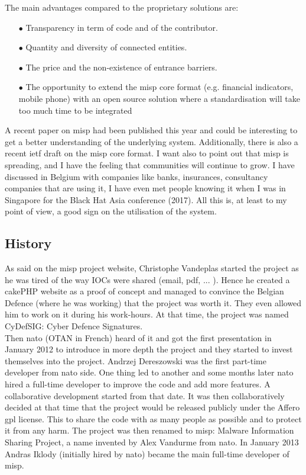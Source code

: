 \documentclass{eplmastersthesis}
\begin{document}
The main advantages compared to the proprietary solutions are:
\begin{itemize}
\item[$\bullet$] Transparency in term of code and of the contributor.
\item[$\bullet$] Quantity and diversity of connected entities.
\item[$\bullet$] The price and the non-existence of entrance barriers.
\item[$\bullet$] The opportunity to extend the \gls{misp} core format (e.g. financial indicators, mobile phone) with an open source solution where a standardisation will take too much time to be integrated
\end{itemize}

A recent paper on \gls{misp} \cite{wagner2016misp} had been published this year and could be interesting to get a better understanding of the underlying system. Additionally, there is also a recent \gls{ietf} draft on the \gls{misp} core format\cite{MispDraft}.
I want also to point out that \gls{misp} is spreading, and I have the feeling that communities will continue to grow. I have discussed in Belgium with companies like banks, insurances, consultancy companies that are using it, I have even met people knowing it when I was in Singapore for the Black Hat Asia conference (2017). All this is, at least to my point of view, a good sign on the utilisation of the system.

\subsection{History}
As said on the \gls{misp} project website, Christophe Vandeplas started the project as he was tired of the way IOCs were shared (email, pdf, ... ). Hence he created a cakePHP website as a proof of concept and managed to convince the Belgian Defence (where he was working) that the project was worth it. They even allowed him to work on it during his work-hours. At that time, the project was named CyDefSIG: Cyber Defence Signatures.\\

Then \gls{nato} (OTAN in French) heard of it and got the first presentation in January 2012 to introduce in more depth the project and they started to invest themselves into the project. Andrzej Dereszowski was the first part-time developer from  \gls{nato} side.
One thing led to another and some months later  \gls{nato} hired a full-time developer to improve the code and add more features. A collaborative development started from that date. 
It was then collaboratively decided at that time that the project would be released publicly under the Affero \gls{gpl} license. This to share the code with as many people as possible and to protect it from any harm.
The project was then renamed to \gls{misp}: Malware Information Sharing Project, a name invented by Alex Vandurme from  \gls{nato}.
In January 2013 Andras Iklody (initially hired by  \gls{nato}) became the main full-time developer of \gls{misp}.\\
\end{document}
